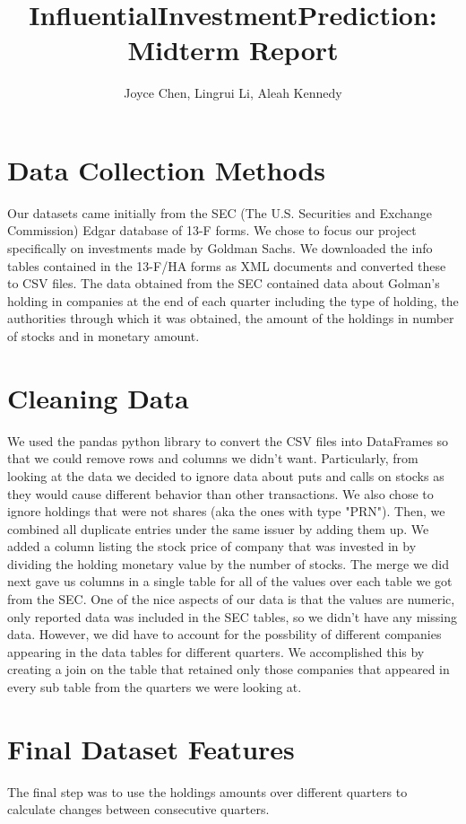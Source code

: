 \documentclass{article}
\title{InfluentialInvestmentPrediction: Midterm Report}
\author{Joyce Chen, Lingrui Li, Aleah Kennedy}
\begin{document}
\maketitle
\section*{Data Collection Methods}
Our datasets came initially from the SEC (The U.S. Securities and Exchange Commission) Edgar database of 13-F forms. We chose to focus our project specifically on investments made by Goldman Sachs. We downloaded the info tables contained in the 13-F/HA forms as XML documents and converted these to CSV files. The data obtained from the SEC contained data about Golman's holding in companies at the end of each quarter including the type of holding, the authorities through which it was obtained, the amount of the holdings in number of stocks and in monetary amount. 
\section*{Cleaning Data}

We used the pandas python library to convert the CSV files into DataFrames so that we could remove rows and columns we didn't want. Particularly, from looking at the data we decided to ignore data about puts and calls on stocks as they would cause different behavior than other transactions. We also chose to ignore holdings that were not shares (aka the ones with type "PRN"). Then, we combined all duplicate entries under the same issuer by adding them up. We added a column listing the stock price of company that was invested in by dividing the holding monetary value by the number of stocks. The merge we did next gave us columns in a single table for all of the values over each table we got from the SEC. One of the nice aspects of our data is that the values are numeric, only reported data was included in the SEC tables, so we didn't have any missing data. However, we did have to account for the possbility of different companies appearing in the data tables for different quarters. We accomplished this by creating a join on the table that retained only those companies that appeared in every sub table from the quarters we were looking at.
\section*{Final Dataset Features}The final step was to use the holdings amounts over different quarters to calculate changes between consecutive quarters.
\end{document}

